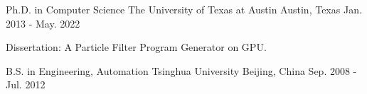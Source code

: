 

\begin{cventries}

  \cventry
  {Ph.D. in Computer Science} %
  {The University of Texas at Austin} %
  {Austin, Texas} %
  {Jan. 2013 - May. 2022} %
  {
    \begin{cvitems} %
    \item {Dissertation: A Particle Filter Program Generator on GPU.}
    \end{cvitems}
  }
  \cventry
  {B.S. in Engineering, Automation}
  {Tsinghua University}
  {Beijing, China}
  {Sep. 2008 - Jul. 2012}
  {}
  
\end{cventries}
